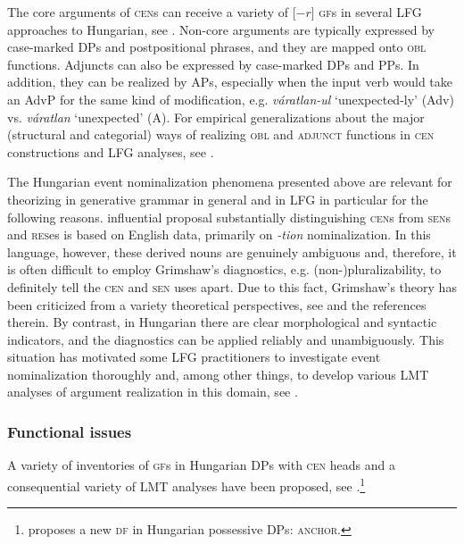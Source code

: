 \documentclass[output=paper,hidelinks]{langscibook}
\begin{document}
The core arguments of \textsc{cen}s can receive a variety of [$-r$] \textsc{gf}s in several LFG approaches to Hungarian, see . Non-core arguments are typically expressed by case-marked DPs and postpositional phrases, and they are mapped onto \textsc{obl} functions. Adjuncts can also be expressed by case-marked DPs and PPs. In addition, they can be realized by APs, especially when the input verb would take an AdvP for the same kind of modification, e.g. \textit{váratlan-ul} `unexpected-ly' (Adv) vs. \textit{váratlan} `unexpected' (A).  For empirical generalizations about the major (structural and categorial) ways of realizing \textsc{obl} and \textsc{adjunct} functions in \textsc{cen} constructions and LFG analyses, see \citet{Laczko95,Laczko01}.

The Hungarian event nominalization phenomena presented above are relevant for theorizing in generative grammar in general and in LFG in particular for the following reasons.  influential proposal substantially distinguishing \textsc{cen}s from \textsc{sen}s and \textsc{res}es is based on English data, primarily on \textit{{}-tion} nominalization. In this language, however, these derived nouns are genuinely ambiguous and, therefore, it is often difficult to employ Grimshaw's diagnostics, e.g. (non-)pluralizability, to definitely tell the \textsc{cen} and \textsc{sen} uses apart. Due to this fact, Grimshaw's theory has been criticized from a variety theoretical perspectives, see \citet{Laczko00} and the references therein. By contrast, in Hungarian there are clear morphological and syntactic indicators, and the diagnostics can be applied reliably and unambiguously. This situation has motivated some LFG practitioners to investigate event nominalization thoroughly and, among other things, to develop various LMT analyses of argument realization in this domain, see .


\subsubsection{Functional issues}
\label{sec:FinnoUgric:8.2.2}

A variety of inventories of \textsc{gf}s in Hungarian DPs with \textsc{cen} heads and a consequential variety of LMT analyses have been proposed, see .\footnote{\citet{Charters14} proposes a new \textsc{df} in Hungarian possessive DPs: \textsc{anchor}.}
\end{document}
